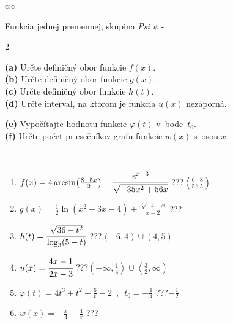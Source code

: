 \documentclass[10pt]{report}
\begin{document}
\begin{tabular}{c:c}
\begin{minipage}[c][104.5mm][t]{0.5\linewidth}
\begin{center}
\vspace{7mm}
{\huge Funkcia jednej premennej, skupina \textit{Psi $\psi$} -}\\[5mm]
\begin{minipage}{0.95\linewidth}
\begin{center}
{\small \begin{multicols}{2} \raggedright
\textbf{(a)} Určte definičný obor funkcie \(f(x)\). \\[1mm]
\textbf{(b)} Určte definičný obor funkcie \(g(x)\). \\[1mm]
\textbf{(c)} Určte definičný obor funkcie \(h(t)\). \\[1mm]
\textbf{(d)} Určte interval, na ktorom je funkcia \(u(x)\) nezáporná. \par \columnbreak
\textbf{(e)} Vypočítajte hodnotu funkcie \(\varphi(t)\) v~bode~\(t_0\). \\[1mm]
\textbf{(f)} Určte počet priesečníkov grafu funkcie \(w(x)\) s~osou \(x\). \\[1mm]
\end{multicols}
}
\end{center}
\end{minipage}
\\[4mm]
\begin{minipage}{0.79\linewidth}
\begin{center}
\begin{varwidth}{\linewidth}
\begin{enumerate}
\small
\item $f(x) = 4\arcsin\!\left( \frac{8-5x}{2} \right) - \cfrac{e^{x-3}}{\sqrt{-35x^2+56x}}$\quad \dotfill\; ???\;\dotfill \quad $\left\langle\frac{6}{5} , \frac{8}{5}\right)$
\item $g(x) = \frac{1}{2} \ln{\!(x^2-3x-4)}+\frac{\sqrt[3]{-4-x}}{x+2}$\quad \dotfill\; ???\;\dotfill {}
\item $h(t) = \cfrac{\sqrt{36-t^2}}{\log_3(5-t)}$\quad \dotfill\; ???\;\dotfill \quad $\left\langle-6 , 4\right)\cup\left(4 , 5\right)$
\item $u(x) = \cfrac{4x-1}{2x-3}$\quad \dotfill\; ???\;\dotfill \quad $\left(-\infty , \frac{1}{4}\right\rangle\cup\left\langle\frac{3}{2} , \infty\right)$
\item $\varphi(t) = 4t^3+t^2-\frac{6}{t}-2 \enspace , \enspace t_0=-\frac{1}{4}$\quad \dotfill\; ???\;\dotfill \quad $-\frac{1}{2}$
\item $w(x) = -\frac{x}{4}-\frac{4}{x}$\quad \dotfill\; ???\;\dotfill {}

\end{enumerate}
\end{varwidth}
\end{center}
\end{minipage}
\end{center}
\end{minipage}
\end{tabular}
\end{document}
